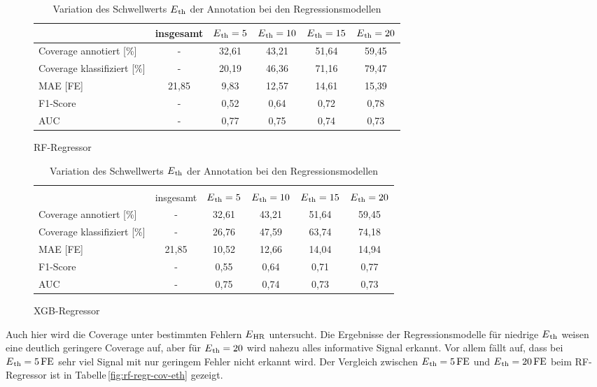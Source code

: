\begin{table}[H]
	\begin{subfigure}{\textwidth}
	\centering
	\begin{tabular}{l || c | c | c | c | c}
								& insgesamt	& $E\textsubscript{th}=5$	& $E\textsubscript{th}=10$	& $E\textsubscript{th}=15$	& $E\textsubscript{th}=20$	\\ \hline
	Coverage annotiert [\%]		& -			& 32,61						& 43{,}21 					& 51,64						& 59,45\\
 	Coverage klassifiziert [\%]	& -			& 20,19						& 46,36 					& 71,16						& 79,47\\
 	\ac{MAE} [FE]				& 21{,}85	& 9,83						& 12,57						& 14,61						& 15,39\\
 	F1-Score 					& -			& 0,52						& 0,64						& 0,72						& 0,78\\
 	AUC 						& -			& 0,77						& 0,75						& 0,74						& 0,73\\
 	\end{tabular}	
	\caption{\ac{RF}-Regressor}
	\end{subfigure}
 	\begin{subfigure}{\textwidth}
	\centering
	\begin{tabular}{l || c | c | c | c | c}
	\multicolumn{6}{l}{	}	\\
								& insgesamt	& $E\textsubscript{th}=5$	& $E\textsubscript{th}=10$	& $E\textsubscript{th}=15$	& $E\textsubscript{th}=20$	\\ \hline
	Coverage annotiert [\%]		& -			& 32,61						& 43{,}21 					& 51,64						& 59,45\\
 	Coverage klassifiziert [\%]	& -			& 26,76						& 47,59 					& 63,74						& 74,18\\
 	\ac{MAE} [FE]				& 21{,}85	& 10,52						& 12,66						& 14,04						& 14,94\\
 	F1-Score 					& -			& 0,55						& 0,64						& 0,71						& 0,77\\
 	AUC 						& -			& 0,75						& 0,74						& 0,73						& 0,73\\
 	\end{tabular}	
	\caption{\ac{XGB}-Regressor}
	\end{subfigure}
	\caption{Variation des Schwellwerts $E\textsubscript{th}$ der Annotation bei den Regressionsmodellen}
	\label{fig:var-eth-regr}
\end{table}

Auch hier wird die Coverage unter bestimmten Fehlern $E\textsubscript{HR}$ untersucht. Die Ergebnisse der Regressionsmodelle für niedrige $E\textsubscript{th}$ weisen eine deutlich geringere Coverage auf, aber für $E\textsubscript{th} = 20$ wird nahezu alles informative Signal erkannt. Vor allem fällt auf, dass bei $E\textsubscript{th}= 5\text{\,}\si{FE}$ sehr viel Signal mit nur geringem Fehler nicht erkannt wird. Der Vergleich zwischen $E\textsubscript{th}= 5\text{\,}\si{FE}$ und $E\textsubscript{th}= 20\text{\,}\si{FE}$ beim \ac{RF}-Regressor ist in Tabelle\,\ref{fig:rf-regr-cov-eth} gezeigt.

